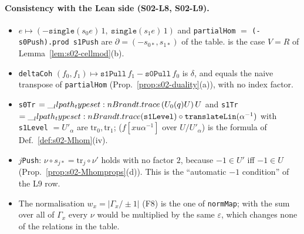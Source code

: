 \paragraph{Consistency with the Lean side (S02-L8, S02-L9).}
\begin{itemize}\sloppy
\item {} $e\mapsto(-\texttt{single}(s_0e)\,1,\ \texttt{single}(s_1e)\,1)$ and \texttt{partialHom} $=$ \texttt{(-s0Push).prod s1Push} are
  $\partial=(-s_{0*},s_{1*})$ of the table.  is the case $V=R$ of Lemma~\ref{lem:s02-cellmod}(b).
\item \texttt{deltaCoh} $(f_0,f_1)\mapsto\texttt{s1Pull}\,f_1-\texttt{s0Pull}\,f_0$ is $\delta$, and equals the naive transpose of \texttt{partialHom}
  (Prop.~\ref{prop:s02-duality}(a)), with no index factor.
\item \texttt{s0Tr} $=\__llpath_typeset:n {Brandt.trace}\,(U_0(q)U)\,U$ and \texttt{s1Tr} $=\__llpath_typeset:n {Brandt.trace}(\texttt{s1Level})\circ\texttt{translateLin}(\alpha^{-1})$ with
  \texttt{s1Level} $=U'_\alpha$ are $\mathrm{tr}_0,\mathrm{tr}_1$;  ($f[xu\alpha^{-1}]$ over $U/U'_\alpha$) is the formula of
  Def.~\ref{def:s02-Mhom}(iv).
\item {}$j$\texttt{Push}: $\nu\circ s_{j*}=\mathrm{tr}_j\circ\nu'$ holds with no factor $2$, because $-1\in U'$ iff $-1\in U$
  (Prop.~\ref{prop:s02-Mhomprops}(d)). This is the ``automatic $-1$ condition'' of the L9 row.
\item The normalisation $w_x=|\Gamma_x/\pm1|$ (F8) is the one of \texttt{normMap}; with the sum over all of $\Gamma_x$ every $\nu$ would be multiplied by the same $\varepsilon$, which
  changes none of the relations in the table.
\end{itemize}
